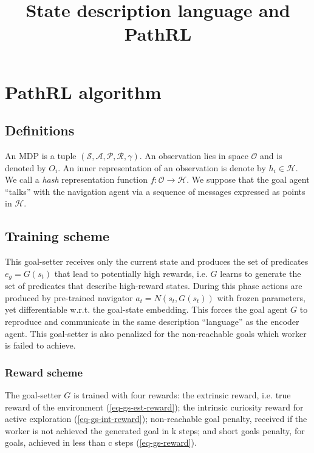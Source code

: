 \documentclass[acmsmall, nonacm]{acmart}
\title{State description language and PathRL}
\begin{document}
\maketitle

\section{PathRL algorithm}

\subsection{Definitions}

An MDP is a tuple $(\mathcal{S}, \mathcal{A}, \mathcal{P}, \mathcal{R}, \gamma)$. An observation lies in space $\mathcal{O}$ and is denoted by $O_i$. An inner representation of an observation is denote by $h_i \in \mathcal{H}$. We call a \emph{hash} representation function $
f: \mathcal{O} \rightarrow \mathcal{H}
$. We suppose that the goal agent ``talks'' with the navigation agent via a sequence of messages expressed as points in $\mathcal{H}$.

\subsection{Training scheme}

This goal-setter receives only the current state and produces the set of predicates $e_g = G(s_t)$ that lead to potentially high rewards, i.e. $G$ learns to generate the set of predicates that describe high-reward states. During this phase actions are produced by pre-trained navigator $a_t = N(s_t, G(s_t))$ with frozen parameters, yet differentiable w.r.t. the goal-state embedding. This forces the goal agent $G$ to reproduce and communicate in the same description ``language'' as the encoder agent. This goal-setter is also penalized for the non-reachable goals which worker is failed to achieve.

\subsubsection{Reward scheme}

The goal-setter $G$ is trained with four rewards: the extrinsic reward, i.e. true reward of the environment (\ref{eq-gs-est-reward}); the intrinsic curiosity reward for active exploration (\ref{eq-gs-int-reward}); non-reachable goal penalty, received if the worker is not achieved the generated goal in k steps; and short goals penalty, for goals, achieved in less than c steps (\ref{eq-gs-reward}).
\end{document}
